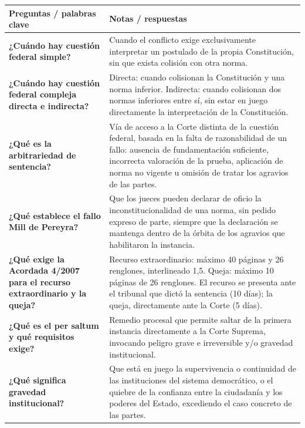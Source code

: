 \documentclass[12pt,oneside]{book}
\begin{document}
\begin{table}[H]
\centering
\begin{tabularx}{\textwidth}{
    >{\raggedright\arraybackslash}p{}
    >{\raggedright\arraybackslash}X
}
\toprule
\textbf{Preguntas / palabras clave} & \textbf{Notas / respuestas} \\
\midrule

\textbf{¿Cuándo hay cuestión federal simple?} &
Cuando el conflicto exige exclusivamente interpretar un postulado de la propia Constitución, sin que exista colisión con otra norma. \\

\textbf{¿Cuándo hay cuestión federal compleja directa e indirecta?} &
Directa: cuando colisionan la Constitución y una norma inferior. Indirecta: cuando colisionan dos normas inferiores entre sí, sin estar en juego directamente la interpretación de la Constitución. \\

\textbf{¿Qué es la arbitrariedad de sentencia?} &
Vía de acceso a la Corte distinta de la cuestión federal, basada en la falta de razonabilidad de un fallo: ausencia de fundamentación suficiente, incorrecta valoración de la prueba, aplicación de norma no vigente u omisión de tratar los agravios de las partes. \\

\textbf{¿Qué establece el fallo Mill de Pereyra?} &
Que los jueces pueden declarar de oficio la inconstitucionalidad de una norma, sin pedido expreso de parte, siempre que la declaración se mantenga dentro de la órbita de los agravios que habilitaron la instancia. \\

\textbf{¿Qué exige la Acordada 4/2007 para el recurso extraordinario y la queja?} &
Recurso extraordinario: máximo 40 páginas y 26 renglones, interlineado 1,5. Queja: máximo 10 páginas de 26 renglones. El recurso se presenta ante el tribunal que dictó la sentencia (10 días); la queja, directamente ante la Corte (5 días). \\

\textbf{¿Qué es el per saltum y qué requisitos exige?} &
Remedio procesal que permite saltar de la primera instancia directamente a la Corte Suprema, invocando peligro grave e irreversible y/o gravedad institucional. \\

\textbf{¿Qué significa gravedad institucional?} &
Que está en juego la supervivencia o continuidad de las instituciones del sistema democrático, o el quiebre de la confianza entre la ciudadanía y los poderes del Estado, excediendo el caso concreto de las partes. \\


\end{tabularx}
\end{table}
\end{document}
